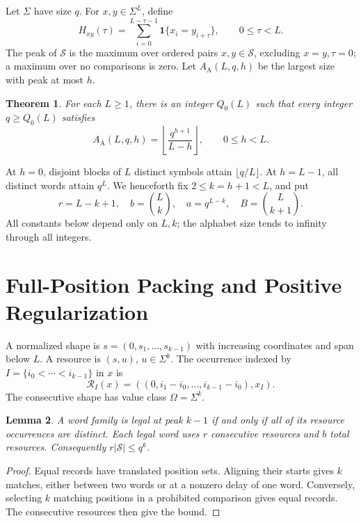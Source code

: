\documentclass[12pt,letterpaper,onecolumn]{article}
\newtheorem{theorem}{Theorem}
\newtheorem{lemma}[theorem]{Lemma}
\theoremstyle{definition}
\newcommand{\AperCap}{A_{\mathrm A}}
\newcommand{\ind}{\mathbf 1}
\newcommand{\calS}{\mathcal S}
\begin{document}
Let $\Sigma$ have size $q$. For $x,y\in\Sigma^L$, define
\begin{equation}
 H_{xy}(\tau)=\sum_{i=0}^{L-\tau-1}\ind\{x_i=y_{i+\tau}\},
 \qquad0\le\tau<L.
 \label{eq:correlation}
\end{equation}
The peak of $\calS$ is the maximum over ordered pairs $x,y\in\calS$, excluding $x=y,\tau=0$; a maximum over no comparisons is zero. Let $\AperCap(L,q,h)$ be the largest size with peak at most $h$.

\begin{theorem}\label{thm:main}
For each $L\ge1$, there is an integer $Q_0(L)$ such that every integer $q\ge Q_0(L)$ satisfies
\begin{equation}
 \AperCap(L,q,h)=\left\lfloor\frac{q^{h+1}}{L-h}\right\rfloor,
 \qquad0\le h<L.
 \label{eq:main}
\end{equation}
\end{theorem}
At $h=0$, disjoint blocks of $L$ distinct symbols attain $\lfloor q/L\rfloor$. At $h=L-1$, all distinct words attain $q^L$. We henceforth fix $2\le k=h+1<L$, and put
\begin{equation}
 r=L-k+1,\quad b=\binom Lk,\quad a=q^{L-k},\quad B=\binom L{k+1}.
 \label{eq:parameters}
\end{equation}
All constants below depend only on $L,k$; the alphabet size tends to infinity through all integers.

\section{Full-Position Packing and Positive Regularization}
A normalized shape is $s=(0,s_1,\ldots,s_{k-1})$ with increasing coordinates and span below $L$. A resource is $(s,u)$, $u\in\Sigma^k$. The occurrence indexed by $I=\{i_0<\cdots<i_{k-1}\}$ in $x$ is
\begin{equation}
 \mathcal R_I(x)=((0,i_1-i_0,\ldots,i_{k-1}-i_0),x_I).
 \label{eq:record}
\end{equation}
The consecutive shape has value class $\Omega=\Sigma^k$.

\begin{lemma}\label{lem:resources}
A word family is legal at peak $k-1$ if and only if all of its resource occurrences are distinct. Each legal word uses $r$ consecutive resources and $b$ total resources. Consequently $r|\calS|\le q^k$.
\end{lemma}
\begin{proof}
Equal records have translated position sets. Aligning their starts gives $k$ matches, either between two words or at a nonzero delay of one word. Conversely, selecting $k$ matching positions in a prohibited comparison gives equal records. The consecutive resources then give the bound.
\end{proof}
\end{document}
